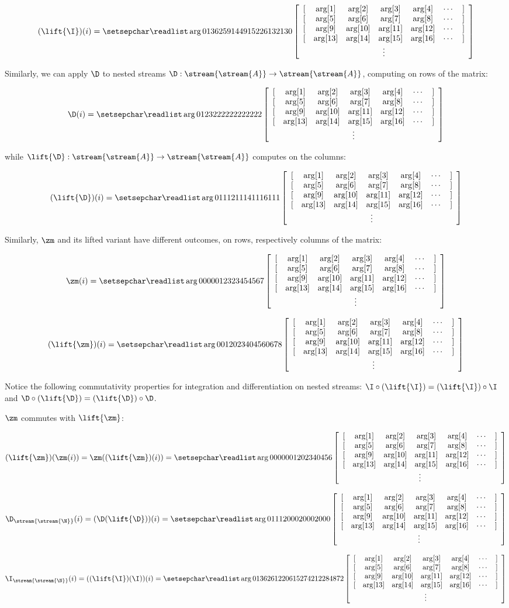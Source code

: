 $$(\lift{\I})(i) = \ssa{0 1 3 6 2 5 9 14 4 9 15 22 6 13 21 30}$$

Similarly, we can apply $\D$ to nested streams $\D : \stream{\stream{A}} \to
\stream{\stream{A}}$, computing on rows of the matrix:

$$\D(i) = \ssa{0 1 2 3 2 2 2 2 2 2 2 2 2 2 2 2}$$

\noindent while $\lift{\D} : \stream{\stream{A}} \to \stream{\stream{A}}$
computes on the columns:

$$(\lift{\D})(i) = \ssa{0 1 1 1 2 1 1 1 4 1 1 1 6 1 1 1}$$

Similarly, $\zm$ and its lifted variant have different outcomes, on rows, 
respectively columns of the matrix:

$$\zm(i) = \ssa{0 0 0 0 0 1 2 3 2 3 4 5 4 5 6 7}$$

$$(\lift{\zm})(i) = \ssa{0 0 1 2 0 2 3 4 0 4 5 6 0 6 7 8}$$

Notice the following commutativity properties for integration and differentiation 
on nested streams: $\I \circ (\lift{\I}) = (\lift{\I}) \circ \I$ and 
$\D \circ (\lift{\D}) = (\lift{\D}) \circ \D$.

$\zm$ commutes with $\lift{\zm}$:

$$(\lift{\zm})(\zm(i)) = \zm((\lift{\zm})(i)) = \ssa{0 0 0 0 0 0 1 2 0 2 3 4 0 4 5 6}$$


$$\D_{\stream{\stream{\N}}}(i) = (\D(\lift{\D}))(i) = \ssa{0 1 1 1 2 0 0 0 2 0 0 0 2 0 0 0}$$

$$\I_{\stream{\stream{\N}}}(i) = ((\lift{\I})(\I))(i)= \ssa{0 1 3 6 2 6 12 20 6 15 27 42 12 28 48 72}$$

